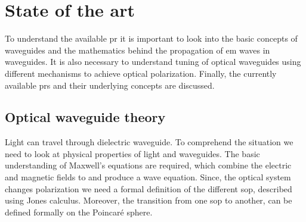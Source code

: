 \documentclass[../report.tex]{subfiles}
\begin{document}
	
	
\chapter{State of the art}
To understand the available \gls{pr} it is important to look into the basic concepts of waveguides and the mathematics behind the propagation of \gls{em} waves in waveguides. It is also necessary to understand tuning of optical waveguides using different mechanisms to achieve optical polarization. Finally, the currently available \gls{pr}s and their underlying concepts are discussed. 

	\section{Optical waveguide theory}
Light can travel through dielectric waveguide. To comprehend the situation we need to look at physical properties of light and waveguides. The basic understanding of Maxwell's equations are required, which combine the electric and magnetic fields to and produce a wave equation. Since, the optical system changes polarization we need a formal definition of the different \gls{sop}, described using Jones calculus. Moreover, the transition from one \gls{sop} to another, can be defined formally on the Poincaré sphere. 
		
\end{document}
